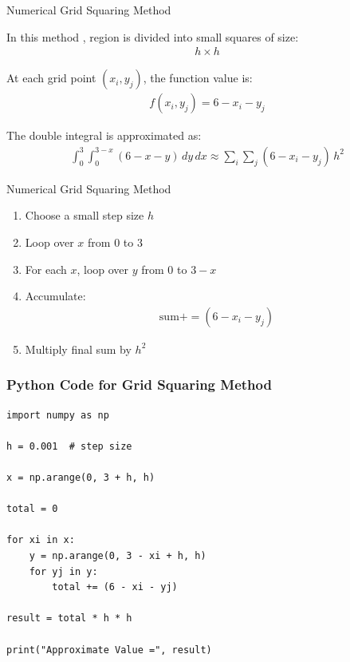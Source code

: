 \documentclass{beamer}
\begin{document}
\begin{frame}{ Numerical Grid Squaring Method }

In this method , region is divided into small squares of size:
\begin{align}
h \times h
\end{align}

At each grid point $(x_i, y_j)$, the function value is:
\begin{align}
f(x_i, y_j) = 6 - x_i - y_j
\end{align}

The double integral is approximated as:
\begin{align}
\int_{0}^{3} \int_{0}^{3-x} (6 - x - y)\, dy\, dx
\approx
\sum_{i} \sum_{j} (6 - x_i - y_j)\, h^2
\end{align}

\end{frame}
\begin{frame}{Numerical Grid Squaring Method}

\begin{enumerate}
\item Choose a small step size $h$
\item Loop over $x$ from $0$ to $3$
\item For each $x$, loop over $y$ from $0$ to $3 - x$
\item Accumulate:
\begin{align}
\text{sum} += (6 - x_i - y_j)
\end{align}
\item Multiply final sum by $h^2$
\end{enumerate}
\end{frame}
\begin{frame}[fragile]
\frametitle{Python Code for Grid Squaring Method}

\begin{lstlisting}
import numpy as np

h = 0.001  # step size

x = np.arange(0, 3 + h, h)

total = 0

for xi in x:
    y = np.arange(0, 3 - xi + h, h)
    for yj in y:
        total += (6 - xi - yj)

result = total * h * h

print("Approximate Value =", result)
\end{lstlisting}
\end{frame}
\end{document}
